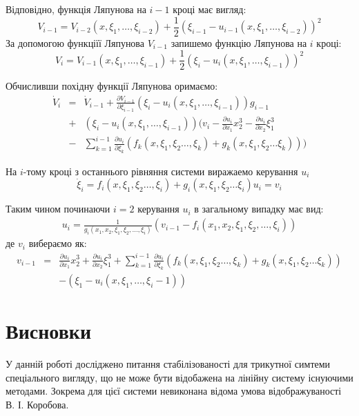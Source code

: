 \documentclass{article}
\begin{document}
Відповідно, функція Ляпунова на $i-1$ кроці має вигляд:
\begin{equation}
    V_{i-1} = V_{i-2}(x,\xi_1, \dots, \xi_{i-2})+\frac{1}{2}
    (\xi_{i-1} - u_{i-1}(x,\xi_1, \dots, \xi_{i-2}))^2
\end{equation}
За допомогою функціїї Ляпунова  $V_{i-1}$ запишемо функцію Ляпунова на  $i$ кроці:
\begin{equation}
    V_i = V_{i-1}(x,\xi_1, \dots, \xi_{i-1})+ 
    \frac{1}{2}(\xi_{i} - u_{i}(x,\xi_1, \dots, \xi_{i-1}))^2
\end{equation}

Обчисливши похідну функції Ляпунова оримаємо:
\begin{eqnarray}
    \dot V_i  &=& \dot V_{i-1} + \frac{\partial V_{i-1}}{\partial \xi_{i-1}}
    (\xi_i - u_i(x, \xi_1, \dots, \xi_{i-1}))g_{i-1} \nonumber\\ 
    &+& (\xi_i - u_{i}(x,\xi_1, \dots, \xi_{i-1}))
    (v_{i} - \frac{\partial u_i}{\partial x_1}x_{2}^3 -\frac{\partial u_i}{\partial x_2}\xi_{1}^3 \nonumber\\
    &-&\sum\limits_{k=1}^{i-1} \frac{\partial u_i}{\partial \xi_k}
    (f_{k}(x,\xi_1, \xi_2 \dots, \xi_{k}) +g_{k}(x, \xi_1, \xi_2 \dots \xi_{k})))
\end{eqnarray}

На $i$-тому кроці з останнього рівняння системи виражаемо керування $u_{i}$ 
\begin{equation}
    \dot \xi_{i} = f_{i}(x,\xi_1, \xi_2 \dots, \xi_{i}) +
    g_{i}(x, \xi_1, \xi_2 \dots \xi_{i})u_{i} = v_{i}
\end{equation}

Таким чином починаючи $i=2$ керування $u_i$ в загальному випадку має вид:
\begin{eqnarray}
u_{i} =\frac{1}{g_{i}(x_1, x_2, \xi_1, \xi_2, \dots ,\xi_i)}
    (v_{i-1}-f_{i}(x_1, x_2, \xi_1, \xi_2, \dots ,\xi_i))
\end{eqnarray}
де $v_i$ вибераємо як:
\begin{eqnarray}
    v_{i-1} &=& \frac{\partial u_i}{\partial x_1}x_{2}^3 + \frac{\partial u_i}{\partial x_2}\xi_{1}^3 
    +\sum\limits_{k=1}^{i-1} \frac{\partial u_i}{\partial \xi_k}
    (f_{k}(x,\xi_1, \xi_2 \dots, \xi_{k}) +g_{k}(x, \xi_1, \xi_2 \dots \xi_{k})) \nonumber\\
    &&-(\xi_1-u_i(x,\xi_1, \dots, \xi_i-1))
\end{eqnarray}


\pagebreak
\section{Висновки}
У данній роботі досліджено питання стабілізованості для  трикутної симтеми спеціального 
вигляду, що не може бути відобажена на лінійну систему існуючими методами. Зокрема 
для цієї системи невиконана відома умова відображуваності В. І. Коробова.
\end{document}
